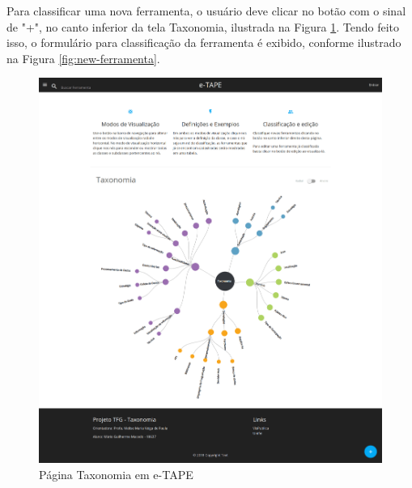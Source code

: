 \par
Para classificar uma nova ferramenta, o usuário deve clicar no botão com o  sinal de "+", no canto inferior da tela Taxonomia, ilustrada na Figura \ref{fig:pag-taxonomia}. Tendo feito isso, o formulário para classificação da ferramenta é exibido, conforme ilustrado na Figura \ref{fig:new-ferramenta}. 

\begin{figure}[!ht]
    \centering
    \includegraphics[scale=0.10]{./figuras/pagina-taxonomia.png}
    \caption{Página Taxonomia em e-TAPE }
    \label{fig:pag-taxonomia}
\end{figure}


